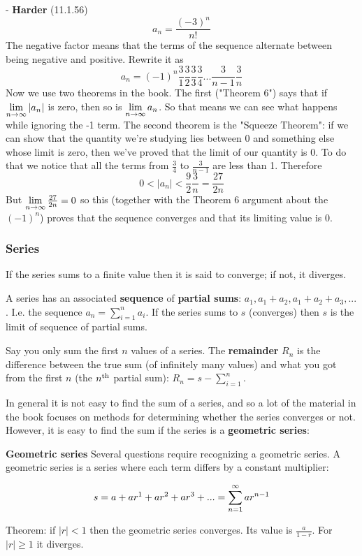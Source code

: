 - \textbf{Harder} (11.1.56)
  $$
  a_n = \frac{(-3)^n}{n!}
  $$
  The negative factor means that the terms of the sequence alternate between being negative and positive. Rewrite it as
  $$
  a_n = (-1)^n\frac{3}{1}\frac{3}{2}\frac{3}{3}\frac{3}{4}...\frac{3}{n-1}\frac{3}{n}
  $$
  Now we use two theorems in the book. The first ("Theorem 6") says that if $\lim\limits_{n \to \infty} |a_n|$ is zero, then so is $\lim\limits_{n \to \infty} a_n$. So that means we can see what happens while ignoring the -1 term. The second theorem is the "Squeeze Theorem": if we can show that the quantity we're studying lies between 0 and something else whose limit is zero, then we've proved that the limit of our quantity is 0. To do that we notice that all the terms from $\frac{3}{4}$ to $\frac{3}{n-1}$ are less than 1. Therefore
  $$
  0 < |a_n| < \frac{9}{2}\frac{3}{n} = \frac{27}{2n}
  $$
  But $\lim\limits_{n \to \infty} \frac{27}{2n} = 0$ so this (together with the Theorem 6 argument about the $(-1)^n$) proves that the sequence converges and that its limiting value is 0.

\subsubsection{Series}

If the series sums to a finite value then it is said to converge; if not, it diverges.

A series has an associated \textbf{sequence} of \textbf{partial sums}: $a_1, a_1 + a_2, a_1 + a_2 + a_3, ...$. I.e. the sequence $a_n = \sum_{i=1}^n a_i$. If the series sums to $s$ (converges) then $s$ is the limit of sequence of partial sums.

Say you only sum the first $n$ values of a series. The \textbf{remainder} $R_n$ is the difference between the true sum (of infinitely many values) and what you got from the first $n$ (the $n^{\text{th}}$ partial sum): $R_n = s - \sum_{i=1}^n$.



In general it is not easy to find the sum of a series, and so a lot of the material in the book focuses on methods for determining whether the series converges or not. However, it is easy to find the sum if the series is a \textbf{geometric series}:

\textbf{Geometric series}
Several questions require recognizing a geometric series. A geometric series is a series where each term differs by a constant multiplier:

$$
s = a + ar^1 + ar^2 + ar^3 + ... = \sum_{n=1}^{\infty} ar^{n-1}
$$

Theorem: if $|r| < 1$ then the geometric series converges. Its value is $\frac{a}{1-r}$. For $|r| \geq 1$ it diverges.

